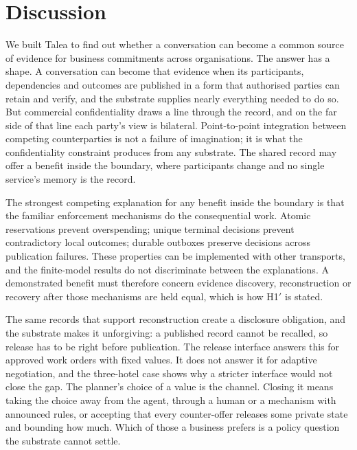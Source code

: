 \section{Discussion}
\label{sec:discussion}

We built Talea to find out whether a conversation can become a common source of evidence for business commitments across organisations. The answer has a shape. A conversation can become that evidence when its participants, dependencies and outcomes are published in a form that authorised parties can retain and verify, and the substrate supplies nearly everything needed to do so. But commercial confidentiality draws a line through the record, and on the far side of that line each party's view is bilateral. Point-to-point integration between competing counterparties is not a failure of imagination; it is what the confidentiality constraint produces from any substrate. The shared record may offer a benefit inside the boundary, where participants change and no single service's memory is the record.

The strongest competing explanation for any benefit inside the boundary is that the familiar enforcement mechanisms do the consequential work. Atomic reservations prevent overspending; unique terminal decisions prevent contradictory local outcomes; durable outboxes preserve decisions across publication failures. These properties can be implemented with other transports, and the finite-model results do not discriminate between the explanations. A demonstrated benefit must therefore concern evidence discovery, reconstruction or recovery after those mechanisms are held equal, which is how H1$'$ is stated.

The same records that support reconstruction create a disclosure obligation, and the substrate makes it unforgiving: a published record cannot be recalled, so release has to be right before publication. The release interface answers this for approved work orders with fixed values. It does not answer it for adaptive negotiation, and the three-hotel case shows why a stricter interface would not close the gap. The planner's choice of a value is the channel. Closing it means taking the choice away from the agent, through a human or a mechanism with announced rules, or accepting that every counter-offer releases some private state and bounding how much. Which of those a business prefers is a policy question the substrate cannot settle.


